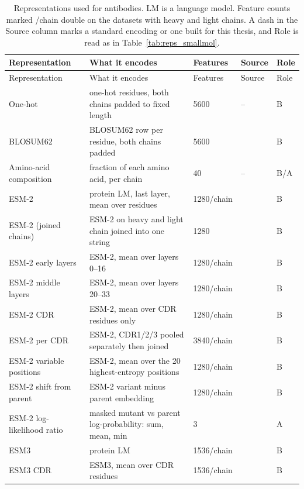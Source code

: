 {\footnotesize
\begin{longtable}{P{2.8cm}P{4.6cm}P{2.0cm}P{1.5cm}P{1.4cm}}

\caption[Representations used for antibodies.]{Representations used for antibodies. LM is a language model. Feature counts marked /chain double on the datasets with heavy and light chains. A dash in the Source column marks a standard encoding or one built for this thesis, and Role is read as in Table~\ref{tab:reps_smallmol}.}\label{tab:reps_antibodies}\\
\toprule
Representation & What it encodes & Features & Source & Role \\
\midrule
\endfirsthead
\toprule
Representation & What it encodes & Features & Source & Role \\
\midrule
\endhead
\bottomrule
\endfoot
One-hot & one-hot residues, both chains padded to fixed length & 5600 & -- & B \\
BLOSUM62 & BLOSUM62 row per residue, both chains padded & 5600 & \citep{Henikoff1992} & B \\
Amino-acid composition & fraction of each amino acid, per chain & 40 & -- & B/A \\
ESM-2 & protein LM, last layer, mean over residues & 1280/chain & \citep{Lin2023} & B \\
ESM-2 (joined chains) & ESM-2 on heavy and light chain joined into one string & 1280 & \citep{Lin2023} & B \\
ESM-2 early layers & ESM-2, mean over layers 0--16 & 1280/chain & \citep{Lin2023} & B \\
ESM-2 middle layers & ESM-2, mean over layers 20--33 & 1280/chain & \citep{Lin2023} & B \\
ESM-2 CDR & ESM-2, mean over CDR residues only & 1280/chain & \citep{Lin2023} & B \\
ESM-2 per CDR & ESM-2, CDR1/2/3 pooled separately then joined & 3840/chain & \citep{Lin2023} & B \\
ESM-2 variable positions & ESM-2, mean over the 20 highest-entropy positions & 1280/chain & \citep{Lin2023} & B \\
ESM-2 shift from parent & ESM-2 variant minus parent embedding & 1280/chain & \citep{Lin2023} & B \\
ESM-2 log-likelihood ratio & masked mutant vs parent log-probability: sum, mean, min & 3 & \citep{Meier2021} & A \\
ESM3 & protein LM & 1536/chain & \citep{Hayes2025} & B \\
ESM3 CDR & ESM3, mean over CDR residues & 1536/chain & \citep{Hayes2025} & B \\

\end{longtable}}
